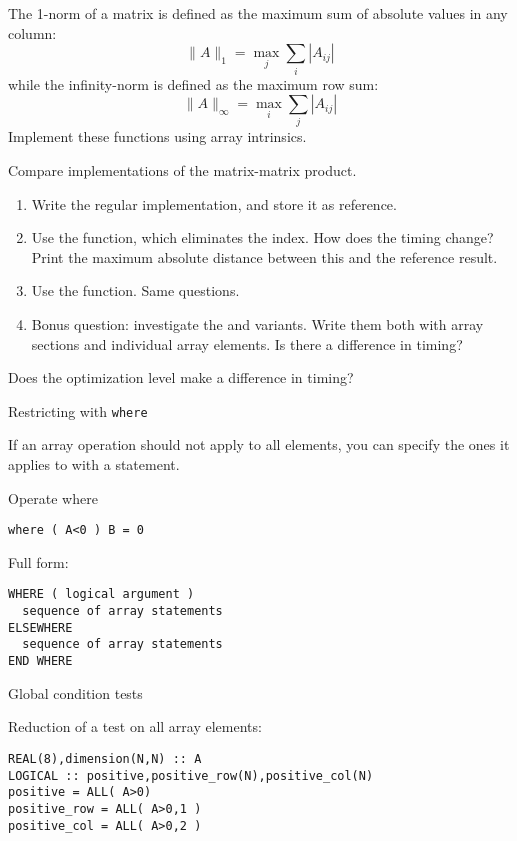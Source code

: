 \begin{exercise}
  \label{ex:fmatnorm}
  The 1-norm of a matrix is defined as the maximum sum of absolute
  values in any column:
  \[ \|A\|_1 = \max_j \sum_i |A_{ij}| \]
  while the infinity-norm is defined as the maximum row sum:
  \[ \|A\|_\infty = \max_i \sum_j |A_{ij}| \]
  Implement these functions using array intrinsics.
\end{exercise}

\begin{exercise}
  \label{ex:fmatmul}
  Compare implementations of the matrix-matrix product.
  \begin{enumerate}
  \item Write the regular  implementation, and store it as
    reference.
  \item Use the  function, which eliminates the 
    index. How does the timing change? Print the maximum absolute
    distance between this and the reference result.
  \item Use the  function. Same questions.
  \item Bonus question: investigate the  and 
    variants. Write them both with array sections and individual array
    elements. Is there a difference in timing?
  \end{enumerate}
  Does the optimization level make a difference in timing?
\end{exercise}

 {Restricting with \tt{where}}

If an array operation should not apply to all elements, you can
specify the ones it applies to with a  statement.

\begin{block}{Operate where}
  \label{sl:farray-where}
\begin{lstlisting}
where ( A<0 ) B = 0
\end{lstlisting}

Full form:
\begin{lstlisting}
WHERE ( logical argument )
  sequence of array statements
ELSEWHERE
  sequence of array statements
END WHERE
\end{lstlisting}
\end{block}

 {Global condition tests}

Reduction of a test on all array elements:
\begin{lstlisting}
REAL(8),dimension(N,N) :: A
LOGICAL :: positive,positive_row(N),positive_col(N)
positive = ALL( A>0)
positive_row = ALL( A>0,1 )
positive_col = ALL( A>0,2 )
\end{lstlisting}

